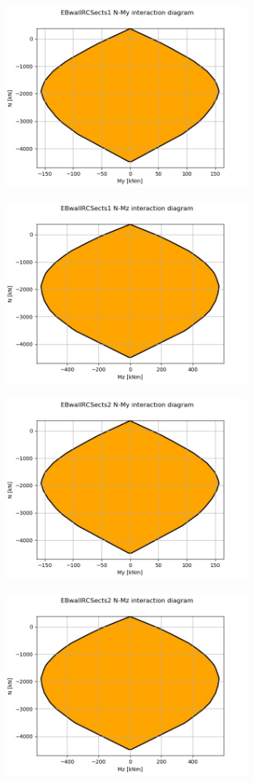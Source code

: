 
\begin{center}
\includegraphics[width=80mm]{ramp_wall/resLC/text/sections/EBwallRCSects1NMy}
\end{center}
\begin{center}
\includegraphics[width=80mm]{ramp_wall/resLC/text/sections/EBwallRCSects1NMz}
\end{center}

\begin{center}
\includegraphics[width=80mm]{ramp_wall/resLC/text/sections/EBwallRCSects2NMy}
\end{center}
\begin{center}
\includegraphics[width=80mm]{ramp_wall/resLC/text/sections/EBwallRCSects2NMz}
\end{center}
